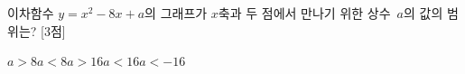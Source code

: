 이차함수 $y=x^2-8x+a$의 그래프가 $x$축과 두 점에서 만나기 위한 상수~$a$의 값의 범위는? \mbox{[3점]}
\begin{choices32}{$a>8$}{$a<8$}{$a>16$}{$a<16$}{$a<-16$}\end{choices32}
